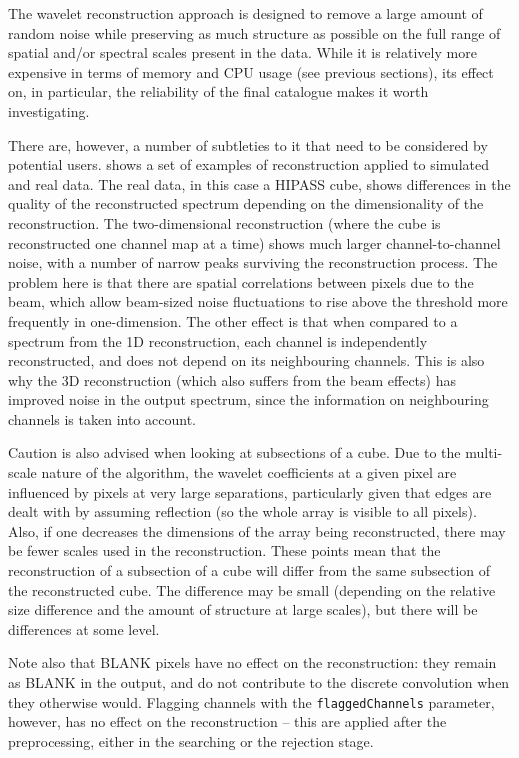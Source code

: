 
The \atrous wavelet reconstruction approach is designed to remove a
large amount of random noise while preserving as much structure as
possible on the full range of spatial and/or spectral scales present
in the data. While it is relatively more expensive in terms of memory
and CPU usage (see previous sections), its effect on, in particular,
the reliability of the final catalogue makes it worth investigating.

There are, however, a number of subtleties to it that need to be
considered by potential users. \citet{whiting12} shows a set of
examples of reconstruction applied to simulated and real data. The
real data, in this case a HIPASS cube, shows differences in the
quality of the reconstructed spectrum depending on the dimensionality
of the reconstruction. The two-dimensional reconstruction (where the
cube is reconstructed one channel map at a time) shows much larger
channel-to-channel noise, with a number of narrow peaks surviving the
reconstruction process. The problem here is that there are spatial
correlations between pixels due to the beam, which allow beam-sized
noise fluctuations to rise above the threshold more frequently in
one-dimension. The other effect is that when compared to a spectrum
from the 1D reconstruction, each channel is independently
reconstructed, and does not depend on its neighbouring channels. This
is also why the 3D reconstruction (which also suffers from the beam
effects) has improved noise in the output spectrum, since the
information on neighbouring channels is taken into account.

Caution is also advised when looking at subsections of a cube. Due to
the multi-scale nature of the algorithm, the wavelet coefficients at a
given pixel are influenced by pixels at very large separations,
particularly given that edges are dealt with by assuming reflection
(so the whole array is visible to all pixels). Also, if one decreases
the dimensions of the array being reconstructed, there may be fewer
scales used in the reconstruction. These points mean that the
reconstruction of a subsection of a cube will differ from the same
subsection of the reconstructed cube. The difference may be small
(depending on the relative size difference and the amount of structure
at large scales), but there will be differences at some level.

Note also that BLANK pixels have no effect on the reconstruction: they
remain as BLANK in the output, and do not contribute to the discrete
convolution when they otherwise would. Flagging channels with the
\texttt{flaggedChannels} parameter, however, has no effect on the
reconstruction -- this are applied after the preprocessing, either in
the searching or the rejection stage.

